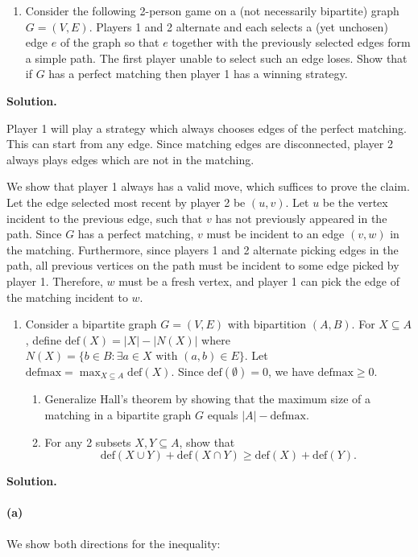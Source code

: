 \documentclass[11pt,letterpaper]{article}
\theoremstyle{definition}
\newcommand{\solution}{\medskip\noindent\textbf{Solution.}\par\medskip}
\begin{document}
\begin{enumerate}[resume]
\item[7.*] Consider the following 2-person game on a (not necessarily bipartite) graph $G = (V,E)$. Players 1 and 2 alternate and each selects a (yet unchosen) edge $e$ of the graph so that $e$ together with the previously selected edges form a simple path. The first player unable to select such an edge loses. Show that if $G$ has a perfect matching then player 1 has a winning strategy.
\end{enumerate}

\solution
Player 1 will play a strategy which always chooses edges of the perfect matching. 
This can start from any edge. 
Since matching edges are disconnected, player 2 always plays edges which are not in the matching.

We show that player 1 always has a valid move, which suffices to prove the claim.
Let the edge selected most recent by player 2 be $(u,v)$. 
Let $u$ be the vertex incident to the previous edge, such that $v$ has not previously appeared in the path.
Since $G$ has a perfect matching, $v$ must be incident to an edge $(v,w)$ in the matching.
Furthermore, since players 1 and 2 alternate picking edges in the path, all previous vertices on the path must be incident to some edge picked by player 1.
Therefore, $w$ must be a fresh vertex, and player 1 can pick the edge of the matching incident to $w$.

\begin{enumerate}[resume]
\item[8.*] Consider a bipartite graph $G = (V,E)$ with bipartition $(A,B)$. For $X \subseteq A$, define $\mathrm{def}(X) = |X| - |N(X)|$ where $N(X) = \{b \in B : \exists a \in X \text{ with } (a,b) \in E\}$. Let $\mathrm{defmax} = \max_{X \subseteq A} \mathrm{def}(X)$. Since $\mathrm{def}(\emptyset) = 0$, we have $\mathrm{defmax} \geq 0$.
\begin{enumerate}
\item Generalize Hall's theorem by showing that the maximum size of a matching in a bipartite graph $G$ equals $|A| - \mathrm{defmax}$.
\item For any 2 subsets $X, Y \subseteq A$, show that
\[
\mathrm{def}(X \cup Y) + \mathrm{def}(X \cap Y) \geq \mathrm{def}(X) + \mathrm{def}(Y).
\]
\end{enumerate}
\end{enumerate}

\solution

\paragraph{(a)}
We show both directions for the inequality:
\end{document}
